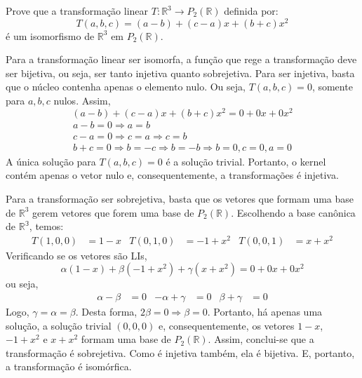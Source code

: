 \begin{question}
  Prove que a transformação linear $T: \mathbb{R}^3 \rightarrow P_2(\mathbb{R})$ definida por:
  \begin{equation}
    T(a, b, c) = (a-b) + (c-a) x + (b+c) x^2
  \end{equation}
  é um isomorfismo de $\mathbb{R}^3$ em $P_2(\mathbb{R})$.
\end{question}

\begin{resolution}
  Para a transformação linear ser isomorfa, a função que rege a transformação deve ser bijetiva, ou seja, ser tanto injetiva quanto sobrejetiva. Para ser injetiva, basta que o núcleo contenha apenas o elemento nulo. Ou seja, $T(a, b, c) = 0$, somente para $a, b, c$ nulos. Assim,
  \begin{equation}
    (a-b) + (c-a)x + (b+c)x^2 = 0 + 0 x + 0 x^2
  \end{equation}
  \begin{gather}
    a - b = 0 \Rightarrow a = b \\
    c - a = 0 \Rightarrow c = a \Rightarrow c = b \\
    b+c = 0 \Rightarrow b = -c \Rightarrow b = -b \Rightarrow b = 0, c = 0, a = 0
  \end{gather}
  A única solução para $T(a, b, c) = 0$ é a solução trivial. Portanto, o kernel contém apenas o vetor nulo e, consequentemente, a transformações é injetiva. 
  
  Para a transformação ser sobrejetiva, basta que os vetores que formam uma base de $\mathbb{R}^3$ gerem vetores que forem uma base de $P_2(\mathbb{R})$. Escolhendo a base canônica de $\mathbb{R^3}$, temos:
  \begin{align}
    T(1, 0, 0) &= 1 - x &
    T(0, 1, 0) &= -1 + x^2 &
    T(0, 0, 1) &= x + x^2
  \end{align}
  Verificando se os vetores são LIs,
  \begin{equation}
    \alpha (1 - x) + \beta (-1 + x^2) + \gamma (x + x^2) = 0 + 0 x + 0 x^2
  \end{equation}
  ou seja, 
  \vspace{-12pt}
  \begin{align}
    \alpha - \beta &= 0 &
    -\alpha + \gamma &= 0 &
    \beta + \gamma &= 0 
  \end{align}
  Logo, $\gamma = \alpha = \beta$. Desta forma, $2\beta = 0 \Rightarrow \beta = 0$. Portanto, há apenas uma solução, a solução trivial $(0,0,0)$ e, consequentemente, os vetores $1-x$, $-1 + x^2$ e $x + x^2$ formam uma base de $P_2(\mathbb{R})$.
  Assim, conclui-se que a transformação é sobrejetiva. Como é injetiva também, ela é bijetiva. E, portanto, a transformação é isomórfica.


\end{resolution}
